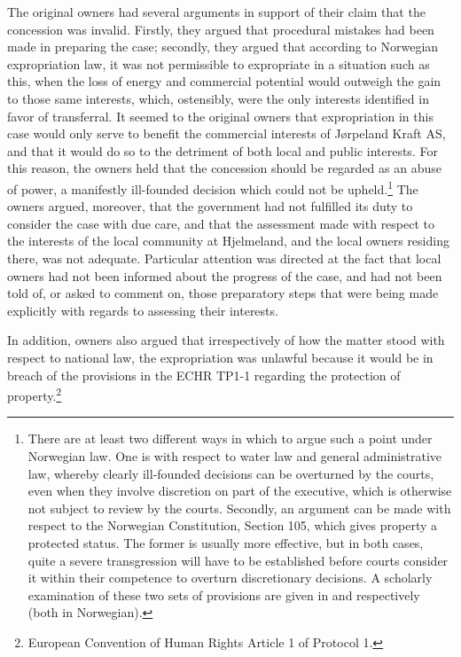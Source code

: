 The original owners had several arguments in support of their claim that the concession was invalid. Firstly, they argued that procedural mistakes had been made in preparing the case; secondly, they argued that according to Norwegian expropriation law, it was not permissible to expropriate in a situation such as this, when the loss of energy and commercial potential would outweigh the gain to those same interests, which, ostensibly, were the only interests identified in favor of transferral. It seemed to the original owners that expropriation in this case would only serve to benefit the commercial interests of Jørpeland Kraft AS, and that it would do so to the detriment of both local and public interests. For this reason, the owners held that the concession should be regarded as an abuse of power, a manifestly ill-founded decision which could not be upheld.\footnote{There are at least two different ways in which to argue such a point under Norwegian law. One is with respect to water law and general administrative law, whereby clearly ill-founded decisions can be overturned by the courts, even when they involve discretion on part of the executive, which is otherwise not subject to review by the courts. Secondly, an argument can be made with respect to the Norwegian Constitution, Section 105, which gives property a protected status. The former is usually more effective, but in both cases, quite a severe transgression will have to be established before courts consider it within their competence to overturn discretionary decisions. A scholarly examination of these two sets of provisions are given in \cite{Efvl} and \cite{flei} respectively (both in Norwegian).} The owners argued, moreover, that the government had not fulfilled its duty to consider the case with due care, and that the assessment made with respect to the interests of the local community at Hjelmeland, and the local owners residing there, was not adequate. Particular attention was directed at the fact that local owners had not been informed about the progress of the case, and had not been told of, or asked to comment on, those preparatory steps that were being made explicitly with regards to assessing their interests. 

In addition, owners also argued that irrespectively of how the matter stood with respect to national law, the expropriation was unlawful because it would be in breach of the provisions in the ECHR TP1-1 regarding the protection of property.\footnote{European Convention of Human Rights Article 1 of Protocol 1.}

